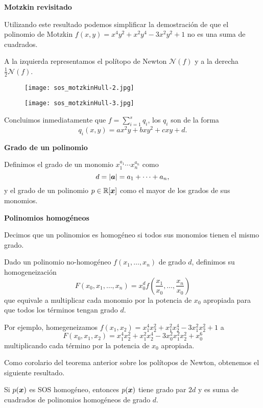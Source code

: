 \textbf{Motzkin revisitado}

Utilizando este resultado podemos simplificar la demostración de que el polinomio de Motzkin $f(x, y) = x^4y^2 + x^2y^4 - 3x^2y^2+1$ no es una suma de cuadrados.

A la izquierda representamos el polítopo de Newton $\mathcal{N}(f)$ y a la derecha $\frac{1}{2}\mathcal{N}(f)$.

\begin{figure}
    \centering
    \begin{minipage}{0.45\textwidth}
        \centering
        \texttt{[image: sos\_motzkinHull-2.jpg]} %
    \end{minipage}\hfill
    \begin{minipage}{0.45\textwidth}
        \centering
        \texttt{[image: sos\_motzkinHull-3.jpg]} %
    \end{minipage}
\end{figure}

Concluimos inmediatamente que $f = \sum_{i=1}^s q_i$, los $q_i$ son de la forma
$$
q_i(x, y) = a x^2y + b x y^2 + c xy + d.
$$


\textbf{Grado de un polinomio}

Definimos el grado de un monomio $x_1^{a_1} \cdots x_n^{a_n}$ como
$$d = |\bm{a}| = a_1 + \dots + a_n,$$
y el grado de un polinomio $p \in \mathbb{R}[\bm{x}]$ como el mayor de los grados de sus monomios.


\textbf{Polinomios homogéneos}

Decimos que un polinomios es homogéneo si todos sus monomios tienen el mismo grado.

Dado un polinomio no-homogéneo $f(x_1, \dots, x_n)$ de grado $d$, definimos su homogeneización
$$F(x_0, x_1, \dots, x_n) = x_0^d f\left(\frac{x_1}{x_0}, \dots, \frac{x_n}{x_0}\right)$$
que equivale a multiplicar cada monomio por la potencia de $x_0$ apropiada para que todos los términos tengan grado $d$.


Por ejemplo, homegeneizamos $f(x_1, x_2) = x_1^4x_2^2 + x_1^2x_2^4 - 3x_1^2x_2^2+1$ a
$$
F(x_0, x_1, x_2) = x_1^4x_2^2 + x_1^2x_2^4 - 3x_0^2x_1^2x_2^2+x_0^6
$$
multiplicando cada término por la potencia de $x_0$ apropiada.

Como corolario del teorema anterior sobre los polítopos de Newton, obtenemos el siguiente resultado.

\begin{prop} Si $p(\bm{x})$ es SOS homogéneo, entonces $p(\bm{x})$ tiene grado par $2d$ y es suma de cuadrados de polinomios homogéneos de grado $d$.
\end{prop}


